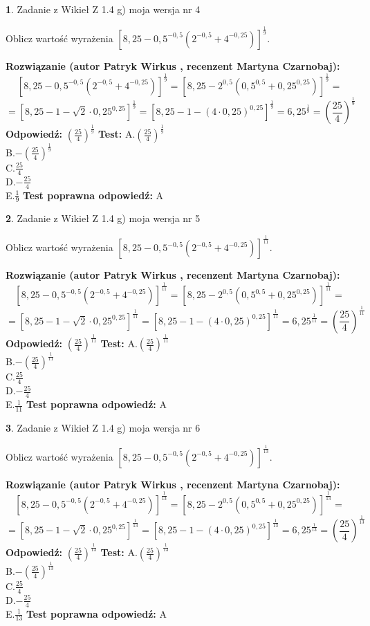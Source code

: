 \documentclass[12pt, a4paper]{article}
\theoremstyle{definition} %
\newtheorem{zad}{}
\newcommand{\zadStart}[1]{\begin{zad}#1\newline}
\newcommand{\zadStop}{\end{zad}}
\newcommand{\rozwStart}[2]{\noindent \textbf{Rozwiązanie (autor #1 , recenzent #2): }\newline}
\newcommand{\rozwStop}{\newline}
\newcommand{\odpStart}{\noindent \textbf{Odpowiedź:}\newline}
\newcommand{\odpStop}{\newline}
\newcommand{\testStart}{\noindent \textbf{Test:}\newline}
\newcommand{\testStop}{\newline}
\newcommand{\kluczStart}{\noindent \textbf{Test poprawna odpowiedź:}\newline}
\newcommand{\kluczStop}{\newline}
\begin{document}
\zadStart{Zadanie z Wikieł Z 1.4 g) moja wersja nr 4}

Oblicz wartość wyrażenia $[8,25-0,5^{-0,5}(2^{-0,5}+4^{-0,25})]^{\frac{1}{9}}$.
\zadStop
\rozwStart{Patryk Wirkus}{Martyna Czarnobaj}
$$[8,25-0,5^{-0,5}(2^{-0,5}+4^{-0,25})]^{\frac{1}{9}} = [8,25-2^{0,5}(0,5^{0,5}+0,25^{0,25})]^{\frac{1}{9}} =$$
$$=[8,25 - 1 - \sqrt{2} \cdot 0,25^{0,25}]^{\frac{1}{9}} = [8,25 - 1 - (4\cdot 0,25)^{0,25}]^{\frac{1}{9}} = 6,25^{\frac{1}{9}} = (\frac{25}{4})^{\frac{1}{9}}$$
\rozwStop
\odpStart
$(\frac{25}{4})^{\frac{1}{9}}$
\odpStop
\testStart
A.$(\frac{25}{4})^{\frac{1}{9}}$\\ B.$-(\frac{25}{4})^{\frac{1}{9}}$\\ C.$\frac{25}{4}$\\ D.$-\frac{25}{4}$\\ E.$\frac{1}{9}$
\testStop
\kluczStart
A
\kluczStop



\zadStart{Zadanie z Wikieł Z 1.4 g) moja wersja nr 5}

Oblicz wartość wyrażenia $[8,25-0,5^{-0,5}(2^{-0,5}+4^{-0,25})]^{\frac{1}{11}}$.
\zadStop
\rozwStart{Patryk Wirkus}{Martyna Czarnobaj}
$$[8,25-0,5^{-0,5}(2^{-0,5}+4^{-0,25})]^{\frac{1}{11}} = [8,25-2^{0,5}(0,5^{0,5}+0,25^{0,25})]^{\frac{1}{11}} =$$
$$=[8,25 - 1 - \sqrt{2} \cdot 0,25^{0,25}]^{\frac{1}{11}} = [8,25 - 1 - (4\cdot 0,25)^{0,25}]^{\frac{1}{11}} = 6,25^{\frac{1}{11}} = (\frac{25}{4})^{\frac{1}{11}}$$
\rozwStop
\odpStart
$(\frac{25}{4})^{\frac{1}{11}}$
\odpStop
\testStart
A.$(\frac{25}{4})^{\frac{1}{11}}$\\ B.$-(\frac{25}{4})^{\frac{1}{11}}$\\ C.$\frac{25}{4}$\\ D.$-\frac{25}{4}$\\ E.$\frac{1}{11}$
\testStop
\kluczStart
A
\kluczStop



\zadStart{Zadanie z Wikieł Z 1.4 g) moja wersja nr 6}

Oblicz wartość wyrażenia $[8,25-0,5^{-0,5}(2^{-0,5}+4^{-0,25})]^{\frac{1}{13}}$.
\zadStop
\rozwStart{Patryk Wirkus}{Martyna Czarnobaj}
$$[8,25-0,5^{-0,5}(2^{-0,5}+4^{-0,25})]^{\frac{1}{13}} = [8,25-2^{0,5}(0,5^{0,5}+0,25^{0,25})]^{\frac{1}{13}} =$$
$$=[8,25 - 1 - \sqrt{2} \cdot 0,25^{0,25}]^{\frac{1}{13}} = [8,25 - 1 - (4\cdot 0,25)^{0,25}]^{\frac{1}{13}} = 6,25^{\frac{1}{13}} = (\frac{25}{4})^{\frac{1}{13}}$$
\rozwStop
\odpStart
$(\frac{25}{4})^{\frac{1}{13}}$
\odpStop
\testStart
A.$(\frac{25}{4})^{\frac{1}{13}}$\\ B.$-(\frac{25}{4})^{\frac{1}{13}}$\\ C.$\frac{25}{4}$\\ D.$-\frac{25}{4}$\\ E.$\frac{1}{13}$
\testStop
\kluczStart
A
\kluczStop
\end{document}
